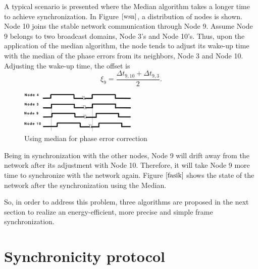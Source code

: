 \documentclass[journal]{IEEEtran}
\begin{document}
\par A typical scenario is presented where the Median algorithm takes a longer time to achieve synchronization. In Figure $\ref{wsn}$, a distribution of nodes is shown. Node 10 joins  the stable network communication through Node 9. Assume Node 9 belongs to two broadcast domains, Node 3's and Node 10's. Thus, upon the application of the median algorithm, the node tends to adjust its wake-up time with the median of the phase errors from its neighbors, Node 3 and Node 10. Adjusting the wake-up time, the offset is
\begin{equation}
\xi_9 = \frac{\Delta t_{9,10} + \Delta t_{9,3}}{2}.
\end{equation}
\begin{figure}
\centering
\includegraphics[width= 0.5\textwidth]{offsetpic}
\caption{Using median for phase error correction} \label{fasik}
\end{figure}
Being in synchronization with the other nodes, Node 9 will drift away from the network after its adjustment with Node 10. Therefore, it will take Node 9 more time to synchronize with the network again. Figure $\ref{fasik}$ shows the state of the network after the synchronization using the Median.
\par So, in order to address this problem, three algorithms are proposed in the next section to realize an energy-efficient, more precise and simple frame synchronization.
\section{\textbf{Synchronicity protocol}}
\end{document}

